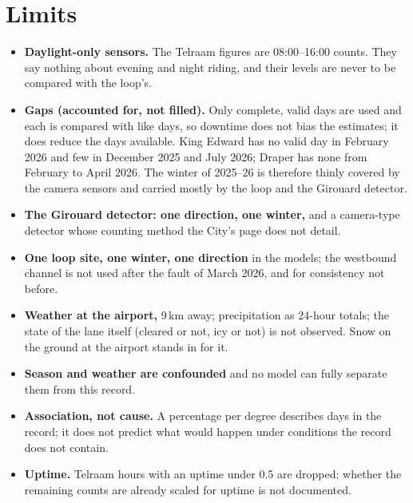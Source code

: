 \documentclass[11pt,a4paper]{article}
\begin{document}
\section{Limits}
\begin{itemize}
\item \textbf{Daylight-only sensors.} The Telraam figures are 08:00--16:00 counts. They say nothing about evening and night riding, and their levels are never to be compared with the loop\textquoteright{}s.
\item \textbf{Gaps (accounted for, not filled).} Only complete, valid days are used and each is compared with like days, so downtime does not bias the estimates; it does reduce the days available. King Edward has no valid day in February 2026 and few in December 2025 and July 2026; Draper has none from February to April 2026. The winter of 2025--26 is therefore thinly covered by the camera sensors and carried mostly by the loop and the Girouard detector.
\item \textbf{The Girouard detector: one direction, one winter,} and a camera-type detector whose counting method the City\textquoteright{}s page does not detail.
\item \textbf{One loop site, one winter, one direction} in the models; the westbound channel is not used after the fault of March 2026, and for consistency not before.
\item \textbf{Weather at the airport,} 9\,km away; precipitation as 24-hour totals; the state of the lane itself (cleared or not, icy or not) is not observed. Snow on the ground at the airport stands in for it.
\item \textbf{Season and weather are confounded} and no model can fully separate them from this record.
\item \textbf{Association, not cause.} A percentage per degree describes days in the record; it does not predict what would happen under conditions the record does not contain.
\item \textbf{Uptime.} Telraam hours with an uptime under 0.5 are dropped; whether the remaining counts are already scaled for uptime is not documented.
\end{itemize}

\appendix
\end{document}
